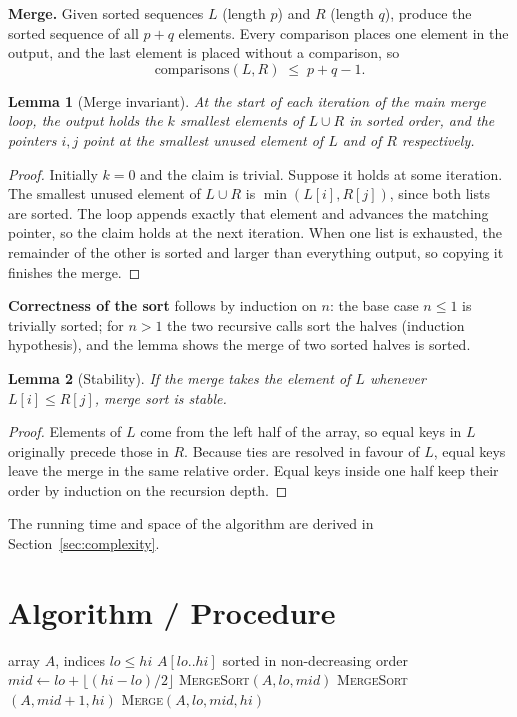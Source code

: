 \documentclass[11pt,a4paper]{article}
\theoremstyle{plain}
\newtheorem{lemma}{Lemma}
\theoremstyle{definition}
\begin{document}
\textbf{Merge.} Given sorted sequences $L$ (length $p$) and $R$ (length $q$), produce the sorted sequence of all $p+q$ elements. Every comparison places one element in the output, and the last element is placed without a comparison, so
\begin{equation}
  \mathrm{comparisons}(L,R)\;\le\;p+q-1.
  \label{eq:merge}
\end{equation}

\begin{lemma}[Merge invariant]\label{lem:inv}
At the start of each iteration of the main merge loop, the output holds the $k$ smallest elements of $L\cup R$ in sorted order, and the pointers $i,j$ point at the smallest unused element of $L$ and of $R$ respectively.
\end{lemma}
\begin{proof}
Initially $k=0$ and the claim is trivial. Suppose it holds at some iteration. The smallest unused element of $L\cup R$ is $\min(L[i],R[j])$, since both lists are sorted. The loop appends exactly that element and advances the matching pointer, so the claim holds at the next iteration. When one list is exhausted, the remainder of the other is sorted and larger than everything output, so copying it finishes the merge.
\end{proof}

\noindent\textbf{Correctness of the sort} follows by induction on $n$: the base case $n\le 1$ is trivially sorted; for $n>1$ the two recursive calls sort the halves (induction hypothesis), and the lemma shows the merge of two sorted halves is sorted.

\begin{lemma}[Stability]\label{lem:stab}
If the merge takes the element of $L$ whenever $L[i]\le R[j]$, merge sort is stable.
\end{lemma}
\begin{proof}
Elements of $L$ come from the left half of the array, so equal keys in $L$ originally precede those in $R$. Because ties are resolved in favour of $L$, equal keys leave the merge in the same relative order. Equal keys inside one half keep their order by induction on the recursion depth.
\end{proof}

The running time and space of the algorithm are derived in Section~\ref{sec:complexity}.

\section{Algorithm / Procedure}\label{sec:algo}
\begin{algorithm}[!ht]
\caption{\textsc{MergeSort}$(A,lo,hi)$}
\begin{algorithmic}[1]
\Require array $A$, indices $lo\le hi$
\Ensure $A[lo..hi]$ sorted in non-decreasing order
 \Return {}
\EndIf
\State $mid\gets lo+\lfloor (hi-lo)/2\rfloor$
\State \textsc{MergeSort}$(A,lo,mid)$
\State \textsc{MergeSort}$(A,mid+1,hi)$
\State \textsc{Merge}$(A,lo,mid,hi)$
\end{algorithmic}
\end{algorithm}
\end{document}
